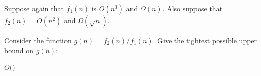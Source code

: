 \begin{prob}
    Suppose again that $f_1(n)$ is $O(n^3)$ and $\Omega(n)$. Also suppose that $f_2(n) = O(n^2)$ and $\Omega(\sqrt n)$.

    Consider the function $g(n) = f_2(n) / f_1(n)$. Give the tightest possible upper bound on $g(n)$:

    $O($$)$
\end{prob}
